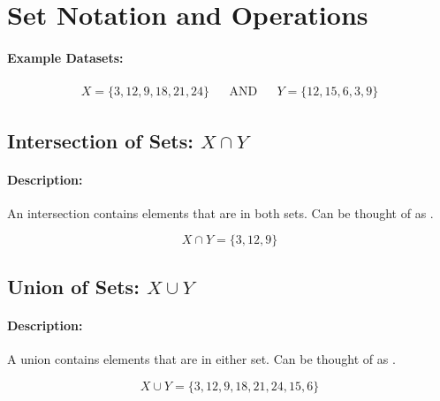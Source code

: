 \documentclass[12pt]{article}
\begin{document}

\section*{Set Notation and Operations}


  \paragraph{Example Datasets:}
  \begin{align*}
    X = \{3, 12, 9, 18, 21, 24\} && \text{AND} &&
    Y = \{12, 15, 6, 3, 9\}
  \end{align*}


  \subsection{Intersection of Sets: $X \cap Y$}
  \paragraph{Description:} An intersection contains elements that are in both sets. Can be thought of as .

  \begin{equation}
    X \cap Y = \{3, 12, 9\}
  \end{equation}%


  \subsection{Union of Sets: $X \cup Y$}
  \paragraph{Description:} A union contains elements that are in either set. Can be thought of as .

  \begin{equation}
    X \cup Y = \{3, 12, 9, 18, 21, 24, 15, 6\}
  \end{equation}%

\end{document}
